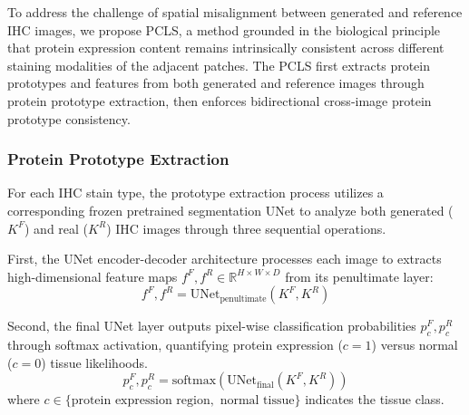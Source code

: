\documentclass[journal,twoside,web]{ieeecolor}
\begin{document}
{To address the challenge of spatial misalignment between generated and reference IHC images, we propose PCLS, a method grounded in the biological principle that protein expression content remains intrinsically consistent across different staining modalities of the adjacent patches. The PCLS first extracts protein prototypes and features from both generated and reference images through protein prototype extraction, then enforces bidirectional cross-image protein prototype consistency.}
\subsubsection{Protein Prototype Extraction}
For each IHC stain type, the prototype extraction process utilizes a corresponding frozen pretrained segmentation UNet to analyze both generated ($K^F$) and real ($K^R$) IHC images through three sequential operations.

First, the UNet encoder-decoder architecture processes each image to extracts high-dimensional feature maps $f^F, f^R \in \mathbb{R}^{H\times W \times D}$ from its penultimate layer:
\begin{equation}
f^F, f^R  = \text{UNet}_{\text{penultimate}}(K^F,K^R)
\end{equation}

{
Second, the final UNet layer outputs pixel-wise classification probabilities $p_c^F, p_c^R$ through softmax activation, quantifying protein expression ($c=1$) versus normal ($c=0$) tissue likelihoods.}
\begin{equation}
p_c^F, p_c^R = \text{softmax}(\text{UNet}_{\text{final}}(K^F,K^R))
\end{equation}
where $c \in \{\text{protein expression region}, \text{ normal tissue}\}$ indicates the tissue class.
\end{document}
